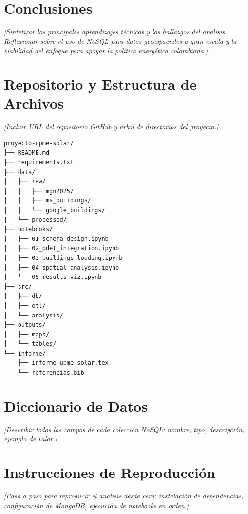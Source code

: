 \documentclass[12pt, a4paper]{report}
\begin{document}
\chapter{Conclusiones}
\label{cap:conclusiones}

\textit{[Sintetizar los principales aprendizajes técnicos y los hallazgos del
análisis. Reflexionar sobre el uso de NoSQL para datos geoespaciales a gran
escala y la viabilidad del enfoque para apoyar la política energética
colombiana.]}

\printbibliography[heading=bibintoc, title={Referencias}]

\appendix

\chapter{Repositorio y Estructura de Archivos}
\label{ap:repo}

\textit{[Incluir URL del repositorio GitHub y árbol de directorios del proyecto.]}

\begin{lstlisting}[caption={Estructura del repositorio}]
proyecto-upme-solar/
├── README.md
├── requirements.txt
├── data/
│   ├── raw/
│   │   ├── mgn2025/
│   │   ├── ms_buildings/
│   │   └── google_buildings/
│   └── processed/
├── notebooks/
│   ├── 01_schema_design.ipynb
│   ├── 02_pdet_integration.ipynb
│   ├── 03_buildings_loading.ipynb
│   ├── 04_spatial_analysis.ipynb
│   └── 05_results_viz.ipynb
├── src/
│   ├── db/
│   ├── etl/
│   └── analysis/
├── outputs/
│   ├── maps/
│   └── tables/
└── informe/
    ├── informe_upme_solar.tex
    └── referencias.bib
\end{lstlisting}

\chapter{Diccionario de Datos}
\label{ap:diccionario}

\textit{[Describir todos los campos de cada colección NoSQL: nombre, tipo,
descripción, ejemplo de valor.]}

\chapter{Instrucciones de Reproducción}
\label{ap:reproduccion}

\textit{[Paso a paso para reproducir el análisis desde cero: instalación
de dependencias, configuración de MongoDB, ejecución de notebooks en orden.]}
\end{document}
